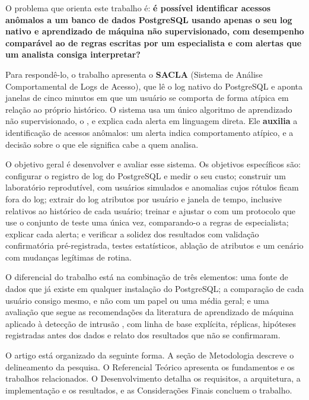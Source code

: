 O problema que orienta este trabalho é: \textbf{é possível identificar acessos anômalos a um
banco de dados PostgreSQL usando apenas o seu log nativo e aprendizado de máquina não
supervisionado, com desempenho comparável ao de regras escritas por um especialista e com
alertas que um analista consiga interpretar?}

Para respondê-lo, o trabalho apresenta o \textbf{SACLA} (Sistema de Análise Comportamental de
Logs de Acesso), que lê o log nativo do PostgreSQL e aponta janelas de cinco minutos em que um
usuário se comporta de forma atípica em relação ao próprio histórico. O sistema usa um único
algoritmo de aprendizado não supervisionado, o \iforest{} \cite{liu2008}, e explica cada alerta
em linguagem direta. Ele \textbf{auxilia} a identificação de acessos anômalos: um alerta indica
comportamento atípico, e a decisão sobre o que ele significa cabe a quem analisa.

O objetivo geral é desenvolver e avaliar esse sistema. Os objetivos específicos são:
configurar o registro de log do PostgreSQL e medir o seu custo; construir um laboratório
reprodutível, com usuários simulados e anomalias cujos rótulos ficam fora do log; extrair do
log atributos por usuário e janela de tempo, inclusive relativos ao histórico de cada usuário;
treinar e ajustar o \iforest{} com um protocolo que use o conjunto de teste uma única vez,
comparando-o a regras de especialista; explicar cada alerta; e verificar a solidez dos
resultados com validação confirmatória pré-registrada, testes estatísticos, ablação de
atributos e um cenário com mudanças legítimas de rotina.

O diferencial do trabalho está na combinação de três elementos: uma fonte de dados que já
existe em qualquer instalação do PostgreSQL; a comparação de cada usuário consigo mesmo, e não
com um papel ou uma média geral; e uma avaliação que segue as recomendações da literatura de
aprendizado de máquina aplicado à detecção de intrusão \cite{sommer2010}, com linha de base
explícita, réplicas, hipóteses registradas antes dos dados e relato dos resultados que não se
confirmaram.

O artigo está organizado da seguinte forma. A seção de Metodologia descreve o delineamento da
pesquisa. O Referencial Teórico apresenta os fundamentos e os trabalhos relacionados. O
Desenvolvimento detalha os requisitos, a arquitetura, a implementação e os resultados, e as
Considerações Finais concluem o trabalho.
